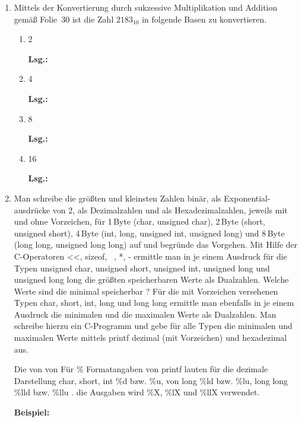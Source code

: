 \documentclass[12pt,a4paper]{scrreprt}
\newcommand{\Lsg}{\par \textbf{Lsg.: }}
\newcommand{\Byte}{\,Byte}
\begin{document}
\begin{enumerate}
\Lsg%

\item Mittels der Konvertierung durch sukzessive Multiplikation und Addition
gemäß Folie~30 ist die Zahl $2183_{10}$ in folgende Basen zu konvertieren.

\begin{enumerate}
\item 2

\Lsg%

\item 4

\Lsg%

\item 8

\Lsg%

\item 16

\Lsg%

\end{enumerate}

\item Man schreibe die größten und kleinsten Zahlen binär, als Exponential-
ausdrücke von 2, als Dezimalzahlen und als Hexadezimalzahlen,
jeweils mit und ohne Vorzeichen, für \si{1}{\Byte} (char, unsigned char),
\si{2}{\Byte} (short, unsigned short), \si{4}{\Byte} (int, long, unsigned int,
unsigned long) und \si{8}{\Byte} (long long, unsigned long long) auf und
begründe das Vorgehen.
Mit Hilfe der C-Operatoren <<, sizeof, ~, *, - ermittle man in je
einem Ausdruck für die Typen unsigned char, unsigned short,
unsigned int, unsigned long und unsigned long long die größten
speicherbaren Werte als Dualzahlen.
Welche Werte sind die minimal speicherbar ?
Für die mit Vorzeichen versehenen Typen char, short, int, long und
long long ermittle man ebenfalls in je einem Ausdruck die minimalen
und die maximalen Werte als Dualzahlen.
Man schreibe hierzu ein C-Programm und gebe für alle Typen die minimalen und maximalen Werte mittels printf dezimal (mit Vorzeichen)
und hexadezimal aus.

Die
von
von
Für
\% Formatangaben von printf lauten für die dezimale Darstellung
char, short, int \%d bzw. \%u, von long \%ld bzw. \%lu,
long long \%lld bzw. \%llu .
die Ausgaben wird \%X, \%lX und \%llX verwendet.

\par \textbf{ Beispiel: }


\end{enumerate}
\end{document}
